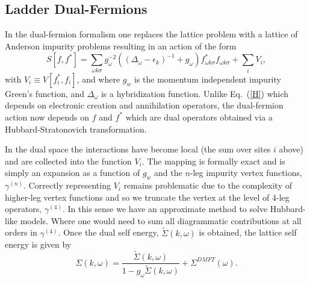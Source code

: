 \documentclass[twocolumn,notitlepage,prb,superscriptaddress,showpacs]{revtex4-1}
\begin{document}
\subsection{Ladder Dual-Fermions}
In the dual-fermion formalism\cite{rubtsov:2008,opendf} one replaces the lattice problem with a lattice of Anderson impurity problems resulting in an action of the form
\begin{equation}
    S[f,f^*]= \sum_{\omega k \sigma}g_\omega^{-2} \left((\Delta_\omega - \epsilon_k)^{-1}
    +g_\omega\right) f^*_{\omega k \sigma} f_{\omega
    k \sigma} + \sum_i V_i,
\end{equation}
with $V_i\equiv V[f^*_i,f_i]$, and where $g_w$ is the momentum independent impurity Green's function, and $\Delta_\omega$ is a hybridization function.  Unlike Eq.~(\ref{H}) which depends on electronic creation and annihilation operators, the dual-fermion action now depends on $f$ and $f^*$ which are dual operators obtained via a Hubbard-Stratonovich transformation.  

In the dual space the interactions have become local (the sum over sites $i$ above) and are collected into the function $V_i$.  
The mapping is formally exact and is simply an expansion as a function of  $g_w$ and the $n$-leg impurity vertex functions, $\gamma^{(n)}$. 
Correctly representing $V_i$ remains problematic due to the complexity of higher-leg vertex functions\cite{ribic:2017} and so we truncate the vertex at the level of 4-leg operators, $\gamma^{(4)}$.
In this sense we have an approximate method to solve Hubbard-like models.   Where one would need to sum all diagrammatic contributions at all orders in $\gamma^{(4)}$.\cite{iskakov:2016,gukelberger:2017} Once the dual self energy, $\tilde{\Sigma}(k,\omega)$ is obtained, the lattice self energy is given by
\begin{equation}
\Sigma(k,\omega)=\frac{\tilde{\Sigma}(k,\omega)}{1-g_{\omega}\tilde{\Sigma}(k,\omega) }+\Sigma^{DMFT}(\omega).
\label{eqn:dualselfenergy}
\end{equation}
\end{document}
